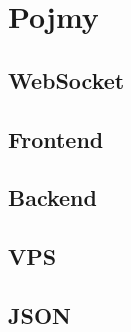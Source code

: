 \section{Pojmy}

\subsection{WebSocket}

\subsection{Frontend}

\subsection{Backend}

\subsection{VPS}

\subsection{JSON}